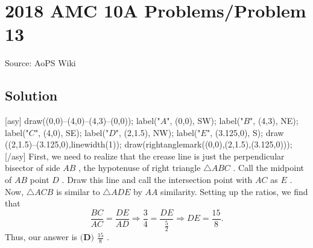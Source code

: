 \documentclass[12pt]{article}
\begin{document}
\section*{{2018 AMC 10A Problems/Problem 13}}
Source: AoPS Wiki

\subsection*{Solution}
[asy] draw((0,0)--(4,0)--(4,3)--(0,0)); label("$A$", (0,0), SW); label("$B$", (4,3), NE); label("$C$", (4,0), SE); label("$D$", (2,1.5), NW); label("$E$", (3.125,0), S); draw ((2,1.5)--(3.125,0),linewidth(1)); draw(rightanglemark((0,0),(2,1.5),(3.125,0))); [/asy] First, we need to realize that the crease line is just the perpendicular bisector of side $AB$ , the hypotenuse of right triangle $\triangle ABC$ . Call the midpoint of $AB$ point $D$ . Draw this line and call the intersection point with $AC$ as $E$ . Now, $\triangle ACB$ is similar to $\triangle ADE$ by $AA$ similarity. Setting up the ratios, we find that \[\frac{BC}{AC}=\frac{DE}{AD} \Rightarrow \frac{3}{4}=\frac{DE}{\frac{5}{2}} \Rightarrow DE=\frac{15}{8}.\] Thus, our answer is $\boxed{\textbf{(D) } \frac{15}{8}}$ .
\end{document}
